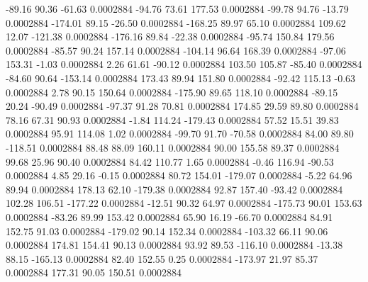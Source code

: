      -89.16       90.36      -61.63     0.0002884
      -94.76       73.61      177.53     0.0002884
      -99.78       94.76      -13.79     0.0002884
     -174.01       89.15      -26.50     0.0002884
     -168.25       89.97       65.10     0.0002884
      109.62       12.07     -121.38     0.0002884
     -176.16       89.84      -22.38     0.0002884
      -95.74      150.84      179.56     0.0002884
      -85.57       90.24      157.14     0.0002884
     -104.14       96.64      168.39     0.0002884
      -97.06      153.31       -1.03     0.0002884
        2.26       61.61      -90.12     0.0002884
      103.50      105.87      -85.40     0.0002884
      -84.60       90.64     -153.14     0.0002884
      173.43       89.94      151.80     0.0002884
      -92.42      115.13       -0.63     0.0002884
        2.78       90.15      150.64     0.0002884
     -175.90       89.65      118.10     0.0002884
      -89.15       20.24      -90.49     0.0002884
      -97.37       91.28       70.81     0.0002884
      174.85       29.59       89.80     0.0002884
       78.16       67.31       90.93     0.0002884
       -1.84      114.24     -179.43     0.0002884
       57.52       15.51       39.83     0.0002884
       95.91      114.08        1.02     0.0002884
      -99.70       91.70      -70.58     0.0002884
       84.00       89.80     -118.51     0.0002884
       88.48       88.09      160.11     0.0002884
       90.00      155.58       89.37     0.0002884
       99.68       25.96       90.40     0.0002884
       84.42      110.77        1.65     0.0002884
       -0.46      116.94      -90.53     0.0002884
        4.85       29.16       -0.15     0.0002884
       80.72      154.01     -179.07     0.0002884
       -5.22       64.96       89.94     0.0002884
      178.13       62.10     -179.38     0.0002884
       92.87      157.40      -93.42     0.0002884
      102.28      106.51     -177.22     0.0002884
      -12.51       90.32       64.97     0.0002884
     -175.73       90.01      153.63     0.0002884
      -83.26       89.99      153.42     0.0002884
       65.90       16.19      -66.70     0.0002884
       84.91      152.75       91.03     0.0002884
     -179.02       90.14      152.34     0.0002884
     -103.32       66.11       90.06     0.0002884
      174.81      154.41       90.13     0.0002884
       93.92       89.53     -116.10     0.0002884
      -13.38       88.15     -165.13     0.0002884
       82.40      152.55        0.25     0.0002884
     -173.97       21.97       85.37     0.0002884
      177.31       90.05      150.51     0.0002884
